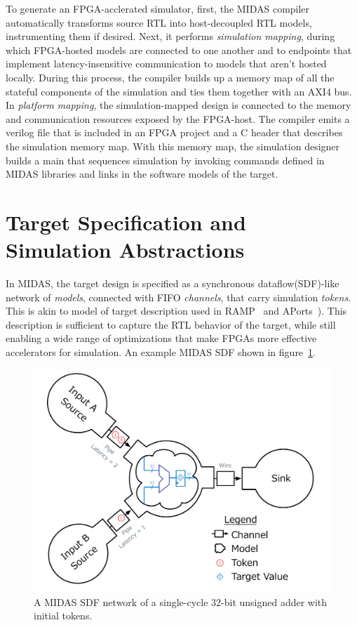 To generate an FPGA-acclerated simulator, first, the MIDAS compiler
automatically transforms source RTL into host-decoupled RTL models,
instrumenting them if desired. Next, it performs \emph{simulation mapping},
during which FPGA-hosted models are connected to one another and to
endpoints that implement latency-insensitive communication to models that
aren't hosted locally. During this process, the compiler builds up a memory map
of all the stateful components of the simulation and ties them together with an
AXI4 bus. In \emph{platform mapping}, the simulation-mapped design is connected
to the memory and communication resources exposed by the FPGA-host. The
compiler emits a verilog file that is included in an FPGA project and a C
header that describes the simulation memory map.  With this memory map, the
simulation designer builds a main that sequences simulation by invoking
commands defined in MIDAS libraries and links in the software models of the
target.

\section{Target Specification and Simulation Abstractions}\label{sec:sdf}

In MIDAS, the target design is specified as a synchronous dataflow(SDF)-like
network of \emph{models}, connected with FIFO \emph{channels}, that carry
simulation \emph{tokens}. This is akin to model of target description used in
RAMP~\cite{ramp} and APorts~\cite{APortNetworks}). This description is sufficient
to capture the RTL behavior of the target, while still enabling a wide range of
optimizations that make FPGAs more effective accelerators for simulation. An
example MIDAS SDF shown in figure~\ref{fig:adder-example}.

\begin{figure}
	\centering
	\includegraphics[width=16cm]{figures/adder-example.pdf}
    \caption{A MIDAS SDF network of a single-cycle 32-bit unsigned adder with initial tokens.}
	\label{fig:adder-example}
\end{figure}

